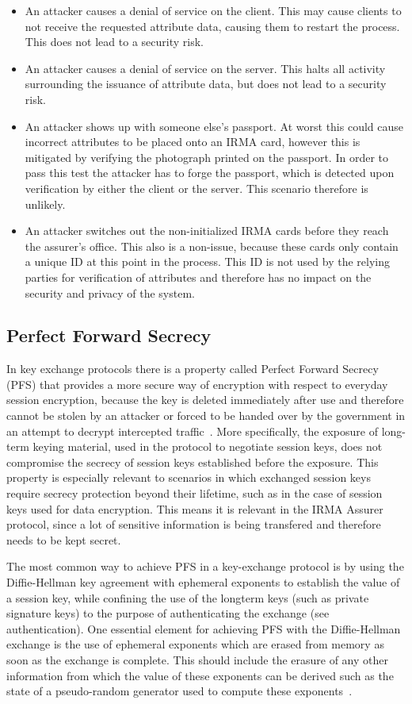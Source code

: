 \begin{itemize}
  \item An attacker causes a denial of service on the client. This may cause clients to not receive the requested attribute data, causing them to restart the process. This does not lead to a security risk.
  \item An attacker causes a denial of service on the server. This halts all activity surrounding the issuance of attribute data, but does not lead to a security risk.
  \item An attacker shows up with someone else's passport. At worst this could cause incorrect attributes to be placed onto an IRMA card, however this is mitigated by verifying the photograph printed on the passport. In order to pass this test the attacker has to forge the passport, which is detected upon verification by either the client or the server. This scenario therefore is unlikely.
  \item An attacker switches out the non-initialized IRMA cards before they reach the assurer's office. This also is a non-issue, because these cards only contain a unique ID at this point in the process. This ID is not used by the relying parties for verification of attributes and therefore has no impact on the security and privacy of the system.
\end{itemize}

\subsection{Perfect Forward Secrecy}
\label{subsubsec:pfs}
In key exchange protocols there is a property called Perfect Forward Secrecy (PFS) that provides a more secure way of encryption with respect to everyday session encryption, because the key is deleted immediately after use and therefore cannot be stolen by an attacker or forced to be handed over by the government in an attempt to decrypt intercepted traffic~\cite{lecture2}. More specifically, the exposure of long-term keying material, used in the protocol to negotiate session keys, does not compromise the secrecy of session keys established before the exposure. This property is especially relevant to scenarios in which exchanged session keys require secrecy protection beyond their lifetime, such as in the case of session keys used for data encryption. This means it is relevant in the IRMA Assurer protocol, since a lot of sensitive information is being transfered and therefore needs to be kept secret.

The most common way to achieve PFS in a key-exchange protocol is by using the Diffie-Hellman key agreement with ephemeral exponents to establish the value of a session key, while confining the use of the longterm keys (such as private signature keys) to the purpose of authenticating the exchange (see authentication). One essential element for achieving PFS with the Diffie-Hellman exchange is the use of ephemeral exponents which are erased from memory as soon as the exchange is complete. This should include the erasure of any other information from which the value of these exponents can be derived such as the state of a pseudo-random generator used to compute these exponents~\cite{PFS}.

